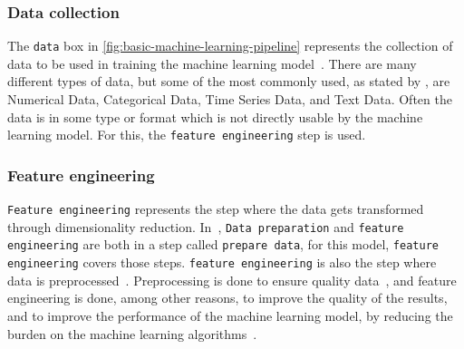 

\subsubsection{Data collection}\label{subsubsec:machine-learning-pipeline-data-collection}
The \texttt{data} box in \autoref{fig:basic-machine-learning-pipeline} represents the collection of data to be used in training the machine learning model~\cite{machine-learning-pipeline-architecture}. There are many different types of data, but some of the most commonly used, as stated by \cite{the-importance-of-machine-learning-data}, are Numerical Data, Categorical Data, Time Series Data, and Text Data. Often the data is in some type or format which is not directly usable by the machine learning model. For this, the \texttt{feature engineering} step is used.

\subsubsection{Feature engineering}\label{subsubsec:machine-learning-pipeline-feature-engineering}
\texttt{Feature engineering} represents the step where the data gets transformed through dimensionality reduction. In~\cite{machine-learning-pipeline-architecture}, \texttt{Data preparation} and \texttt{feature engineering} are both in a step called \texttt{prepare data}, for this model, \texttt{feature engineering} covers those steps. \texttt{feature engineering} is also the step where data is preprocessed~\cite{machine-learning-pipeline-architecture}. Preprocessing is done to ensure quality data~\cite{data-preparation-for-data-mining}, and feature engineering is done, among other reasons, to improve the quality of the results, and to improve the performance of the machine learning model, by reducing the burden on the machine learning algorithms~\cite{dimensionality-reduction-reddy}.

